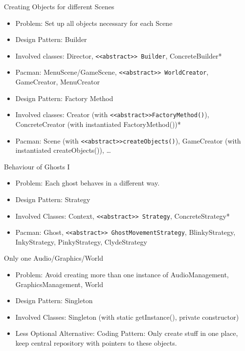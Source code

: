\documentclass[10pt,t,a4paper]{beamer}
\begin{document}
\begin{frame}[fragile,label={sec:orgheadline5}]{Creating Objects for different Scenes}
 \begin{itemize}
\item Problem: Set up all objects necessary for each Scene
\item Design Pattern: Builder
\item Involved classes: Director, \texttt{<<abstract>> Builder}, ConcreteBuilder*
\item Pacman: MenuScene/GameScene, \texttt{<<abstract>> WorldCreator}, GameCreator, MenuCreator
\end{itemize}
\vspace{1cm}
\begin{itemize}
\item Design Pattern: Factory Method
\item Involved classes: Creator (with \texttt{<<abstract>>FactoryMethod()}), ConcreteCreator (with instantiated FactoryMethod())*
\item Pacman: Scene (with \texttt{<<abstract>>createObjects()}), GameCreator (with instantiated createObjects()), \ldots
\end{itemize}
\end{frame}
\begin{frame}[fragile,label={sec:orgheadline6}]{Behaviour of Ghosts I}
 \begin{itemize}
\item Problem: Each ghost behaves in a different way.
\item Design Pattern: Strategy
\item Involved Classes: Context, \texttt{<<abstract>> Strategy}, ConcreteStrategy*
\item Pacman: Ghost, \texttt{<<abstract>> GhostMovementStrategy}, BlinkyStrategy, InkyStrategy, PinkyStrategy, ClydeStrategy
\end{itemize}
\end{frame}
\begin{frame}[label={sec:orgheadline7}]{Only one Audio/Graphics/World}
\begin{itemize}
\item Problem: Avoid creating more than one instance of AudioManagement, GraphicsManagement, World
\item Design Pattern: Singleton
\item Involved Classes: Singleton (with static getInstance(), private constructor)
\item \alert{Less Optional Alternative:} Coding Pattern: Only create stuff in one place, keep central repository with pointers to these objects.
\end{itemize}
\end{frame}
\end{document}
